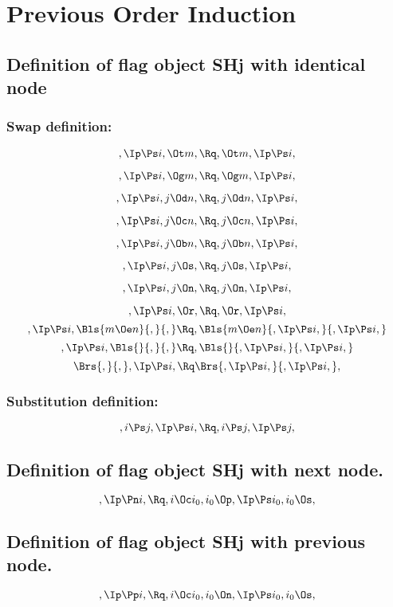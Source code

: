 \chapter{Previous Order Induction}
\section{Definition of flag object SHj with identical node}


\subsection{Swap definition:}
\[,\Ip \Ps i, \Ot m, \Rq , \Ot m, \Ip \Ps i,\]

\[,\Ip \Ps i, \Og m, \Rq , \Og m, \Ip \Ps i,\]

\[,\Ip \Ps i, j \Od n, \Rq , j \Od n, \Ip \Ps i,\]

\[,\Ip \Ps i, j \Oc n, \Rq , j \Oc n, \Ip \Ps i,\]

\[,\Ip \Ps i, j \Ob n, \Rq , j \Ob n, \Ip \Ps i,\]

\[,\Ip \Ps i, j \Os, \Rq , j \Os, \Ip \Ps i,\]

\[,\Ip \Ps i, j \On, \Rq , j \On, \Ip \Ps i,\]

\[,\Ip \Ps i, \Or, \Rq , \Or, \Ip \Ps i,\]
\bigskip
\[,\Ip \Ps i, \Bls{m \Oe n}{,}{,} \Rq , \Bls{m \Oe n}{,\Ip \Ps i,}{,\Ip \Ps i,}\]
\bigskip
\[,\Ip \Ps i, \Bls{}{,}{,} \Rq , \Bls{}{,\Ip \Ps i,}{,\Ip \Ps i,}\]
\bigskip
\[ \Brs{,}{,},\Ip \Ps i, \Rq \Brs{,\Ip \Ps i,}{,\Ip \Ps i,},\]




\bigskip
\bigskip
\subsection{Substitution definition:}
\[,i \Ps j, \Ip \Ps i, \Rq , i\Ps j, \Ip \Ps j,\]



\bigskip
\bigskip
\bigskip
\bigskip
\section{Definition of flag object SHj with next node.}
\[, \Ip \Pn i, \Rq , i \Oc i_0, i_0 \Op, \Ip \Ps i_0, i_0 \Os,\]


\bigskip
\bigskip
\bigskip
\bigskip
\section{Definition of flag object SHj with previous node.}
\[, \Ip \Pp i, \Rq , i \Oc i_0, i_0 \On, \Ip \Ps i_0, i_0 \Os,\]


